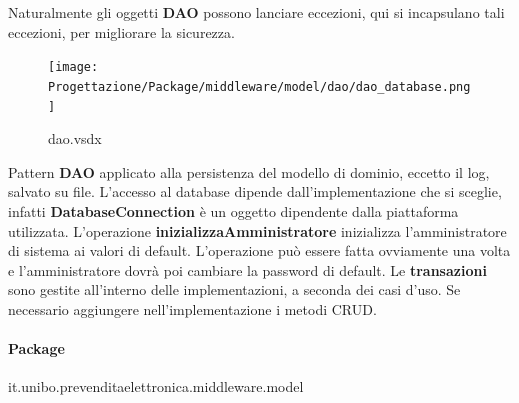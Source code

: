 \documentclass[a4paper]{article}
\begin{document}
Naturalmente gli oggetti \textbf{DAO} possono lanciare eccezioni, qui si incapsulano tali eccezioni, per migliorare la sicurezza.

\newpage

\begin{figure}[H]
    \texttt{[image: Progettazione/Package/middleware/model/dao/dao\_database.png]}
    \centering
    \caption{dao.vsdx}
\end{figure}

Pattern \textbf{DAO} applicato alla persistenza del modello di dominio, eccetto il log, salvato su file. L'accesso al database dipende dall'implementazione che si sceglie, infatti \textbf{DatabaseConnection} è un oggetto dipendente dalla piattaforma utilizzata. L'operazione \textbf{inizializzaAmministratore} inizializza l'amministratore di sistema ai valori di default. L'operazione può essere fatta ovviamente una volta e l'amministratore dovrà poi cambiare la password di default. Le \textbf{transazioni} sono gestite all'interno delle implementazioni, a seconda dei casi d'uso. Se necessario aggiungere nell'implementazione i metodi CRUD.








\newpage

\paragraph{Package} it.unibo.prevenditaelettronica.middleware.model
\end{document}
